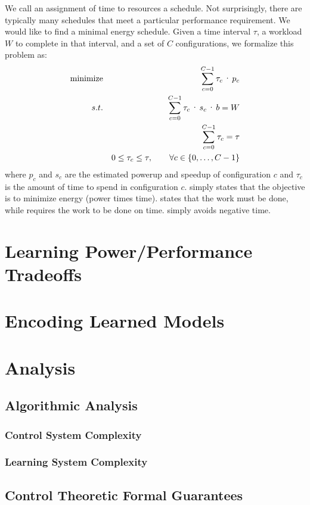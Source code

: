 We call an assignment of time to resources a schedule.  Not
surprisingly, there are typically many schedules that meet a
particular performance requirement.  We would like to find a minimal
energy schedule. Given a time interval $\tau$, a workload $W$ to
complete in that interval, and a set of $C$ configurations, we
formalize this problem as:
\begin{eqnarray}
  \minimize && \sum_{c=0}^{C-1} \tau_c \cdot p_c \label{eqn:power} \\
  \st %
  && \sum_{c=0}^{C-1} \tau_c \cdot s_c \cdot b =  W \label{eqn:work} \\
  && \sum_{c=0}^{C-1} \tau_c =  \tau \label{eqn:deadline} \\
  && 0 \le \tau_c \le \tau, \qquad \forall c \in \{0,\ldots,C-1\} \label{eqn:time}
\end{eqnarray}
where $p_c$ and $s_c$ are the estimated powerup and speedup of
configuration $c$ and $\tau_c$ is the amount of time to spend in
configuration $c$.   simply states that the objective is
to minimize energy (power times time).   states that the
work must be done, while  requires the work to be
done on time.   simply avoids negative time.  


\section{Learning Power/Performance Tradeoffs}


\section{Encoding Learned Models}


\section{Analysis}

\subsection{Algorithmic Analysis}

\subsubsection{Control System Complexity}

\subsubsection{Learning System Complexity}

\subsection{Control Theoretic Formal Guarantees}
